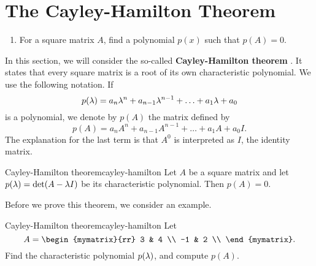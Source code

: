\section{The Cayley-Hamilton Theorem}

\begin{outcome}
  \begin{enumerate}
  \item For a square matrix $A$, find a polynomial $p(x)$ such that $p(A)=0$.
  \end{enumerate}
\end{outcome}

In this section, we will consider the so-called
\textbf{Cayley-Hamilton theorem}%
%
%
. It states that every square
matrix is a root of its own characteristic polynomial. We use the
following notation. If
\begin{equation*}
  p(\lambda) = a_n\lambda^n + a_{n-1}\lambda^{n-1} + \ldots +
  a_1\lambda + a_0
\end{equation*}
is a polynomial, we denote by $p(A)$ the matrix defined by
\begin{equation*}
  p(A) = a_nA^n + a_{n-1}A^{n-1} + \ldots + a_1A + a_0I.
\end{equation*}
The explanation for the last term is that $A^0$ is interpreted as $I$,
the identity matrix.

\begin{theorem}{Cayley-Hamilton theorem}{cayley-hamilton}
  Let $A$ be a square matrix and let $p(\lambda)=\det(A-\lambda
  I)$ be its characteristic polynomial. Then $p(A)=0$.
\end{theorem}

Before we prove this theorem, we consider an example.

\begin{example}{Cayley-Hamilton theorem}{cayley-hamilton}
  Let
  \begin{equation*}
    A = \begin{mymatrix}{rr}
      3 & 4 \\
      -1 & 2 \\
    \end{mymatrix}.
  \end{equation*}
  Find the characteristic polynomial $p(\lambda)$, and compute
  $p(A)$.
\end{example}

